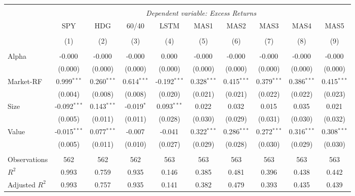 \begin{table}[!htbp] \centering
\begin{tabular}{@{\extracolsep{5pt}}lccccccccc}
\\[-1.8ex]\hline
\hline \\[-1.8ex]
& \multicolumn{9}{c}{\textit{Dependent variable: Excess Returns}} \
\cr \cline{2-10}
\\[-1.8ex] & \multicolumn{1}{c}{SPY} & \multicolumn{1}{c}{HDG} & \multicolumn{1}{c}{60/40} & \multicolumn{1}{c}{LSTM} & \multicolumn{1}{c}{MAS1} & \multicolumn{1}{c}{MAS2} & \multicolumn{1}{c}{MAS3} & \multicolumn{1}{c}{MAS4} & \multicolumn{1}{c}{MAS5}  \\
\\[-1.8ex] & (1) & (2) & (3) & (4) & (5) & (6) & (7) & (8) & (9) \\
\hline \\[-1.8ex]
 Alpha & -0.000$^{}$ & -0.000$^{}$ & -0.000$^{}$ & 0.000$^{}$ & -0.000$^{}$ & -0.000$^{}$ & -0.000$^{}$ & -0.000$^{}$ & -0.000$^{}$ \\
& (0.000) & (0.000) & (0.000) & (0.000) & (0.000) & (0.000) & (0.000) & (0.000) & (0.000) \\
 Market-RF & 0.999$^{***}$ & 0.260$^{***}$ & 0.614$^{***}$ & -0.192$^{***}$ & 0.328$^{***}$ & 0.415$^{***}$ & 0.379$^{***}$ & 0.386$^{***}$ & 0.415$^{***}$ \\
& (0.004) & (0.008) & (0.008) & (0.020) & (0.021) & (0.021) & (0.022) & (0.022) & (0.023) \\
 Size & -0.092$^{***}$ & 0.143$^{***}$ & -0.019$^{*}$ & 0.093$^{***}$ & 0.022$^{}$ & 0.032$^{}$ & 0.015$^{}$ & 0.035$^{}$ & 0.021$^{}$ \\
& (0.005) & (0.011) & (0.011) & (0.028) & (0.030) & (0.029) & (0.031) & (0.030) & (0.032) \\
 Value & -0.015$^{***}$ & 0.077$^{***}$ & -0.007$^{}$ & -0.041$^{}$ & 0.322$^{***}$ & 0.286$^{***}$ & 0.272$^{***}$ & 0.316$^{***}$ & 0.308$^{***}$ \\
& (0.005) & (0.011) & (0.010) & (0.027) & (0.029) & (0.028) & (0.030) & (0.029) & (0.030) \\
\hline \\[-1.8ex]
 Observations & 562 & 562 & 562 & 563 & 563 & 563 & 563 & 563 & 563 \\
 $R^2$ & 0.993 & 0.759 & 0.935 & 0.146 & 0.385 & 0.481 & 0.396 & 0.438 & 0.442 \\
 Adjusted $R^2$ & 0.993 & 0.757 & 0.935 & 0.141 & 0.382 & 0.479 & 0.393 & 0.435 & 0.439 \\

\end{tabular}
\end{table}
